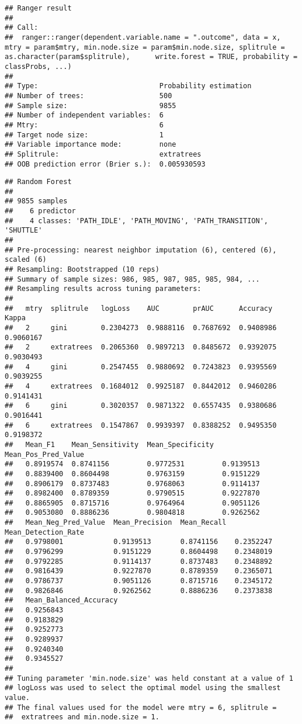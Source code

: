 \documentclass[]{article}
\begin{document}
\begin{verbatim}
## Ranger result
## 
## Call:
##  ranger::ranger(dependent.variable.name = ".outcome", data = x,      mtry = param$mtry, min.node.size = param$min.node.size, splitrule = as.character(param$splitrule),      write.forest = TRUE, probability = classProbs, ...) 
## 
## Type:                             Probability estimation 
## Number of trees:                  500 
## Sample size:                      9855 
## Number of independent variables:  6 
## Mtry:                             6 
## Target node size:                 1 
## Variable importance mode:         none 
## Splitrule:                        extratrees 
## OOB prediction error (Brier s.):  0.005930593
\end{verbatim}

\begin{verbatim}
## Random Forest 
## 
## 9855 samples
##    6 predictor
##    4 classes: 'PATH_IDLE', 'PATH_MOVING', 'PATH_TRANSITION', 'SHUTTLE' 
## 
## Pre-processing: nearest neighbor imputation (6), centered (6), scaled (6) 
## Resampling: Bootstrapped (10 reps) 
## Summary of sample sizes: 986, 985, 987, 985, 985, 984, ... 
## Resampling results across tuning parameters:
## 
##   mtry  splitrule   logLoss    AUC        prAUC      Accuracy   Kappa    
##   2     gini        0.2304273  0.9888116  0.7687692  0.9408986  0.9060167
##   2     extratrees  0.2065360  0.9897213  0.8485672  0.9392075  0.9030493
##   4     gini        0.2547455  0.9880692  0.7243823  0.9395569  0.9039255
##   4     extratrees  0.1684012  0.9925187  0.8442012  0.9460286  0.9141431
##   6     gini        0.3020357  0.9871322  0.6557435  0.9380686  0.9016441
##   6     extratrees  0.1547867  0.9939397  0.8388252  0.9495350  0.9198372
##   Mean_F1    Mean_Sensitivity  Mean_Specificity  Mean_Pos_Pred_Value
##   0.8919574  0.8741156         0.9772531         0.9139513          
##   0.8839400  0.8604498         0.9763159         0.9151229          
##   0.8906179  0.8737483         0.9768063         0.9114137          
##   0.8982400  0.8789359         0.9790515         0.9227870          
##   0.8865905  0.8715716         0.9764964         0.9051126          
##   0.9053080  0.8886236         0.9804818         0.9262562          
##   Mean_Neg_Pred_Value  Mean_Precision  Mean_Recall  Mean_Detection_Rate
##   0.9798001            0.9139513       0.8741156    0.2352247          
##   0.9796299            0.9151229       0.8604498    0.2348019          
##   0.9792285            0.9114137       0.8737483    0.2348892          
##   0.9816439            0.9227870       0.8789359    0.2365071          
##   0.9786737            0.9051126       0.8715716    0.2345172          
##   0.9826846            0.9262562       0.8886236    0.2373838          
##   Mean_Balanced_Accuracy
##   0.9256843             
##   0.9183829             
##   0.9252773             
##   0.9289937             
##   0.9240340             
##   0.9345527             
## 
## Tuning parameter 'min.node.size' was held constant at a value of 1
## logLoss was used to select the optimal model using the smallest value.
## The final values used for the model were mtry = 6, splitrule =
##  extratrees and min.node.size = 1.
\end{verbatim}
\end{document}
